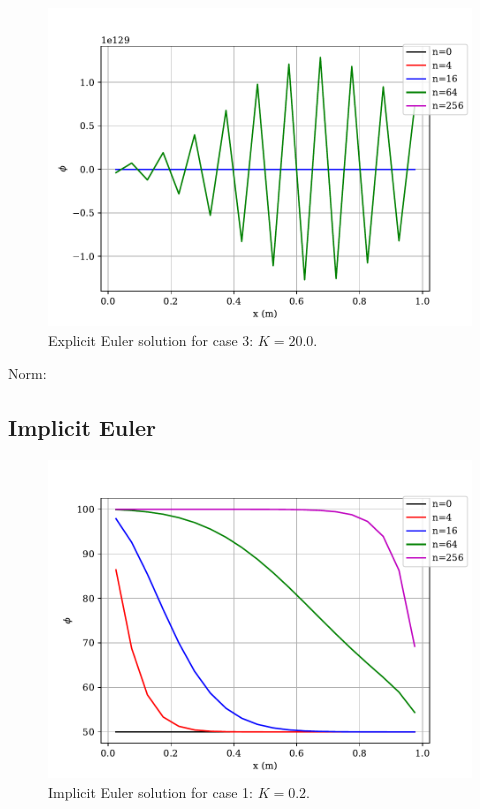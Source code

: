 \documentclass[12pt]{article}
\begin{document}
\begin{figure}[htbp]
    \centering
    \includegraphics[width=\textwidth]{plots/graph_EE_case3.pdf}
    \caption{Explicit Euler solution for case 3: $K=20.0$.}
\end{figure}

Norm:



\clearpage
\subsection{Implicit Euler}
\begin{figure}[htbp]
    \centering
    \includegraphics[width=\textwidth]{plots/graph_IE_case1.pdf}
    \caption{Implicit Euler solution for case 1: $K=0.2$.}
\end{figure}
\end{document}

